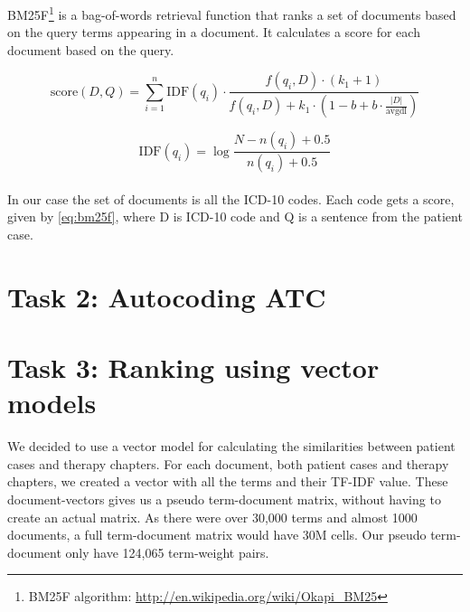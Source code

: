 BM25F\footnote{BM25F algorithm: \url{http://en.wikipedia.org/wiki/Okapi_BM25}} is a bag-of-words retrieval function that ranks a set of documents based on the query terms appearing in a document. It calculates a score for each document based on the query. 

\begin{equation} \label{eq:bm25f}
	\text{score}(D,Q) = \sum_{i=1}^{n} \text{IDF}(q_i) \cdot \frac{f(q_i, D) \cdot (k_1 + 1)}{f(q_i, D) + k_1 \cdot (1 - b + b \cdot \frac{|D|}{\text{avgdl}})}
\end{equation}

\begin{equation} \label{eq:idf}
	\text{IDF}(q_i) = \log \frac{N - n(q_i) + 0.5}{n(q_i) + 0.5}
\end{equation}\\

In our case the set of documents is all the ICD-10 codes. Each code gets a score, given by \autoref{eq:bm25f}, where D is ICD-10 code and Q is a sentence from the patient case. 


\section{Task 2: Autocoding ATC}


\section{Task 3: Ranking using vector models}
\label{sec:task3}
We decided to use a vector model for calculating the similarities between
patient cases and therapy chapters. For each document, both patient cases
and therapy chapters, we created a vector with all the terms and their
TF-IDF value. These document-vectors gives us a pseudo term-document matrix,
without having to create an actual matrix. As there were over 30,000 terms
and almost 1000 documents, a full term-document matrix would have 30M cells.
Our pseudo term-document only have 124,065 term-weight pairs.

